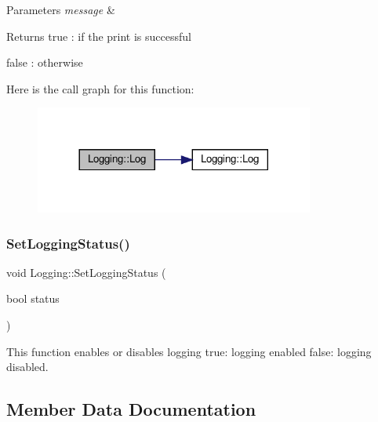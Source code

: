 \begin{DoxyParams}{Parameters}
{\em message} & \\
\hline
\end{DoxyParams}
\begin{DoxyReturn}{Returns}
true \+: if the print is successful 

false \+: otherwise 
\end{DoxyReturn}
Here is the call graph for this function\+:
\nopagebreak
\begin{figure}[H]
\begin{center}
\leavevmode
\includegraphics[width=260pt]{classLogging_a7ad9e952d45e4b456006755beb62e9d3_cgraph}
\end{center}
\end{figure}
\mbox{\label{classLogging_a7eab89a46435adb76ea30a899e9658cc}} 
\subsubsection{\texorpdfstring{Set\+Logging\+Status()}{SetLoggingStatus()}}
{\footnotesize\ttfamily void Logging\+::\+Set\+Logging\+Status (\begin{DoxyParamCaption}\item[{bool}]{status }\end{DoxyParamCaption})}



This function enables or disables logging true\+: logging enabled false\+: logging disabled. 



\subsection{Member Data Documentation}
\mbox{\label{classLogging_adc395a9b0a516df8528b6ef764877a58}} 
